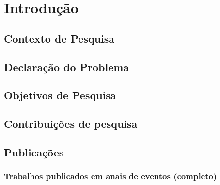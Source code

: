 \chapter{Introdução}

\section{Contexto de Pesquisa}

\section{Declaração do Problema}

\section{Objetivos de Pesquisa}


\section{Contribuições de pesquisa}


\section{Publicações}

\subsection{Trabalhos publicados em anais de eventos (completo)}


